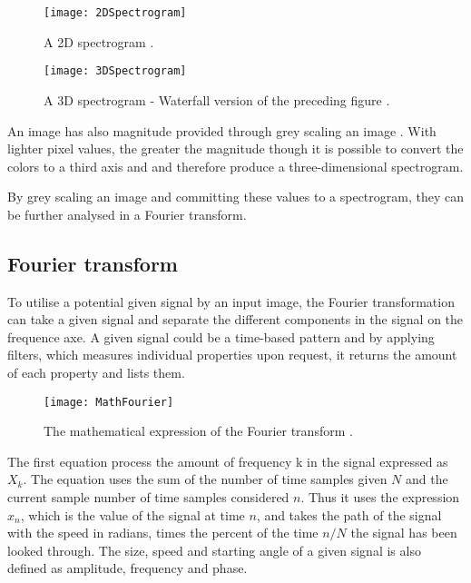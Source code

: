 \begin{figure}[!h]
\centering
\texttt{[image: 2DSpectrogram]}
\caption{\label{fig:2DSpectrogram} A 2D spectrogram \cite{steiglitz1997digital}.}
\end{figure}

\begin{figure}[!h]
\centering
\texttt{[image: 3DSpectrogram]}
\caption{\label{fig:3DSpectrogram} A 3D spectrogram - Waterfall version of the preceding figure \cite{steiglitz1997digital}.}
\end{figure}

An image has also magnitude provided through grey scaling an image \cite{Izotope2014}. With lighter pixel values, the greater the magnitude though it is possible to convert the colors to a third axis and and therefore produce a three-dimensional spectrogram.

By grey scaling an image and committing these values to a spectrogram, they can be further analysed in a Fourier transform.  

\subsection{Fourier transform}\label{sub:fourier}

To utilise a potential given signal by an input image, the Fourier transformation can take a given signal and separate the different components in the signal on the frequence axe. A given signal could be a time-based pattern and by applying filters, which measures individual properties upon request, it returns the amount of each property and lists them. 

\begin{figure}
\centering
\texttt{[image: MathFourier]}
\caption{The mathematical expression of the Fourier transform \cite{MathFourier2013}.}
\end{figure}

The first equation process the amount of frequency k in the signal expressed as \(X_k\). The equation uses the sum of the number of time samples given \(N\) and the current sample number of time samples considered \(n\). Thus it uses the expression \(x_n\), which is the value of the signal at time \(n\), and takes the path of the signal with the speed in radians, times the percent of the time \(n/N\) the signal has been looked through. The size, speed and starting angle of a given signal is also defined as amplitude, frequency and phase.      

